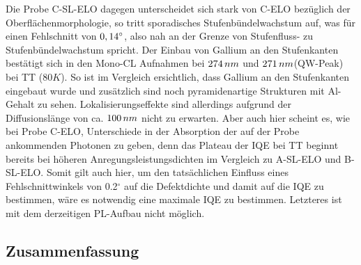 Die Probe C-SL-ELO dagegen unterscheidet sich stark von C-ELO bezüglich der Oberflächenmorphologie, so tritt sporadisches Stufenbündelwachstum auf, was für einen Fehlschnitt von $0,14 \degree$, also nah an der Grenze von Stufenfluss- zu Stufenbündelwachstum spricht. Der Einbau von Gallium an den Stufenkanten bestätigt sich in den Mono-CL Aufnahmen bei $274 \thinspace nm$ und $271 \thinspace nm$(QW-Peak) bei TT ($80K$). So ist im Vergleich ersichtlich, dass Gallium an den Stufenkanten eingebaut wurde und zusätzlich sind noch pyramidenartige Strukturen mit Al-Gehalt zu sehen. Lokalisierungseffekte sind allerdings aufgrund der Diffusionslänge von ca. $100 \thinspace nm$ nicht zu erwarten. Aber auch hier scheint es, wie bei Probe C-ELO, Unterschiede in der Absorption der auf der Probe ankommenden Photonen zu geben, denn das Plateau der IQE bei TT beginnt bereits bei höheren Anregungsleistungsdichten im Vergleich zu A-SL-ELO und B-SL-ELO. Somit gilt auch hier, um den tatsächlichen Einfluss eines Fehlschnittwinkels von 0.2$^\circ$ auf die Defektdichte und damit auf die IQE zu bestimmen, wäre es notwendig eine maximale IQE zu bestimmen. Letzteres ist mit dem derzeitigen PL-Aufbau nicht möglich.


\subsection{Zusammenfassung}

